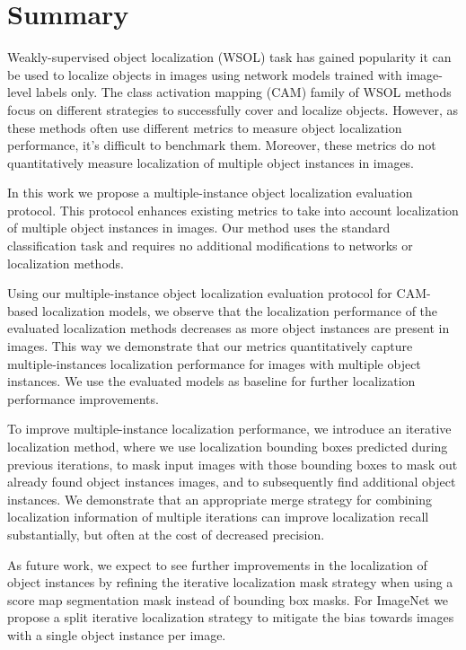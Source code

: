 \chapter*{Summary}

Weakly-supervised object localization (WSOL) task has gained popularity it can be used to localize objects in images using network models trained with image-level labels only. The class activation mapping (CAM) family of WSOL methods focus on different strategies to successfully cover and localize objects. However, as these methods often use different metrics to measure object localization performance, it's difficult to benchmark them. Moreover, these metrics do not quantitatively measure localization of multiple object instances in images.

In this work we propose a multiple-instance object localization evaluation protocol. This protocol enhances existing metrics to take into account localization of multiple object instances in images. Our method uses the standard classification task and requires no additional modifications to networks or localization methods.

Using our multiple-instance object localization evaluation protocol for CAM-based localization models, we observe that the localization performance of the evaluated localization methods decreases as more object instances are present in images. This way we demonstrate that our metrics quantitatively capture multiple-instances localization performance for images with multiple object instances. We use the evaluated models as baseline for further localization performance improvements.

To improve multiple-instance localization performance, we introduce an iterative localization method, where we use localization bounding boxes predicted during previous iterations, to mask input images with those bounding boxes to mask out already found object instances images, and to subsequently find additional object instances. We demonstrate that an appropriate merge strategy for combining localization information of multiple iterations can improve localization recall substantially, but often at the cost of decreased precision. 

As future work, we expect to see further improvements in the localization of object instances by refining the iterative localization mask strategy when using a score map segmentation mask instead of bounding box masks. For ImageNet we propose a split iterative localization strategy to mitigate the bias towards images with a single object instance per image.